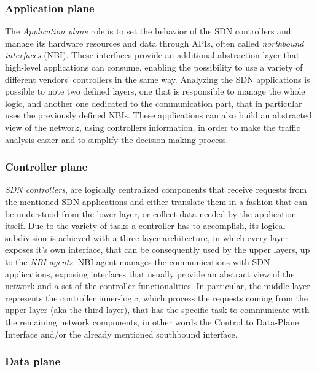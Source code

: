 \subsubsection{Application plane}

The \emph{Application plane} role is to set the behavior of the SDN controllers 
and manage its hardware resources and data through APIs, often called 
\emph{northbound interfaces} (NBI).
These interfaces provide an additional abstraction layer that high-level 
applications can consume, enabling the possibility to use a variety of 
different vendors' controllers in the same way.
Analyzing the SDN applications is possible to note two defined layers, one that 
is responsible to manage the whole logic, and another one dedicated to the 
communication part, that in particular uses the previously defined NBIs.
These applications can also build an abstracted view of the network, using
controllers information, in order to make the traffic analysis easier and to 
simplify the decision making process.

\subsubsection{Controller plane}

\emph{SDN controllers}, are logically centralized components that
receive requests from the mentioned SDN applications and either translate them 
in a fashion that can be understood from the lower layer, or collect 
data needed by the application itself. 
Due to the variety of tasks a controller has to accomplish, its logical 
subdivision is achieved with a three-layer architecture, in which every layer 
exposes it's own interface, that can be consequently used by the upper 
layers, up to the \emph{NBI agents}.
NBI agent manages the communications with SDN applications, exposing interfaces
that usually provide an abstract view of the network and a set of
the controller functionalities.
In particular, the middle layer represents the controller inner-logic, which 
process the requests coming from the upper layer (aka the third layer), that 
has the specific task to communicate with the remaining network components, in 
other words the Control to Data-Plane Interface and/or the already 
mentioned southbound interface.

\subsubsection{Data plane}

